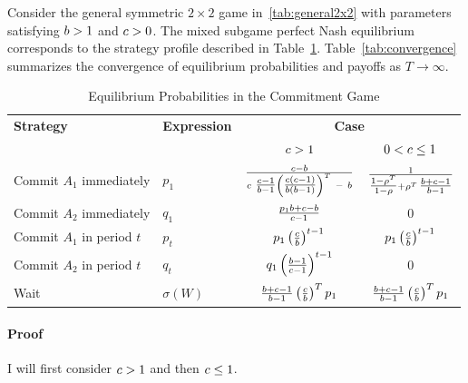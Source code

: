 \documentclass[../paper.tex]{subfiles}
\begin{document}
\begin{lemma}\label{lem:convergence}
    Consider the general symmetric $2\times2$ game in~\autoref{tab:general2x2} with parameters satisfying $b>1$ and $c>0$. The mixed subgame perfect Nash equilibrium corresponds to the strategy profile described in Table~\ref{tab:lemma4-probabilities}. Table~\ref{tab:convergence} summarizes the convergence of equilibrium probabilities and payoffs as $T\to\infty$.
\end{lemma}
\begin{table}[ht]
\centering
\begin{tabular}{llcc}
\toprule
\textbf{Strategy} & \textbf{Expression} & \multicolumn{2}{c}{\textbf{Case}} \\
& & $c > 1$ & $0 < c \leq 1$ \\
\midrule
Commit $A_1$ immediately & 
$p_1$ &
$\tfrac{\cparam - \bparam}{\cparam\ \tfrac{\cparam-1}{\bparam-1} \left( \tfrac{\cparam(\cparam - 1)}{\bparam(\bparam - 1)} \right)^T\ -\ b }$ &
$\tfrac{1}{\tfrac{1 - \rho^{T}}{1 - \rho} + \rho^{T}\,\tfrac{b + c - 1}{b - 1}}$ \\
[4ex]
 
Commit $A_2$ immediately & 
$q_1$ &
$\tfrac{p_1 b + c - b}{c - 1}$ &
$0$ \\
[3ex]
 
Commit $A_1$ in period $t$ & 
$p_t$ &
$p_1 \left( \tfrac{c}{b} \right)^{t - 1}$ &
$p_1 \left( \tfrac{c}{b} \right)^{t - 1}$ \\
[3ex]
 
Commit $A_2$ in period $t$ & 
$q_t$ &
$q_1 \left( \tfrac{b - 1}{c - 1} \right)^{t - 1}$ &
$0$ \\
[3ex]
 
Wait & 
$\sigma(W)$ &
$\tfrac{b + c - 1}{b-1} \left( \tfrac{c}{b} \right)^T p_1$ &
$\tfrac{b + c - 1}{b-1} \left( \tfrac{c}{b} \right)^T p_1$ \\
\bottomrule
\end{tabular}
\caption{Equilibrium Probabilities in the Commitment Game}
\label{tab:lemma4-probabilities}
\end{table}
\paragraph{Proof}
I will first consider $c>1$ and then $c\leq1$.
 
\end{document}
